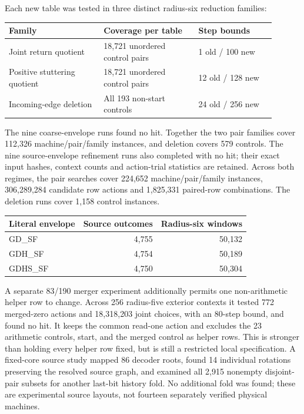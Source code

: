 Each new table was tested in three distinct radius-six reduction families:
\begin{center}\small
\begin{tabular}{@{}p{0.32\linewidth}p{0.32\linewidth}p{0.26\linewidth}@{}}
\toprule Family & Coverage per table & Step bounds\\\midrule
Joint return quotient & 18,721 unordered control pairs & 1 old / 100 new\\[3pt]
Positive stuttering quotient & 18,721 unordered control pairs & 12 old / 128 new\\[3pt]
Incoming-edge deletion & All 193 non-start controls & 24 old / 256 new\\
\bottomrule
\end{tabular}
\end{center}
The nine coarse-envelope runs found no hit. Together the two pair families
cover 112,326 machine/pair/family instances, and deletion covers 579 controls.
The nine source-envelope refinement runs also completed with no hit;
their exact input hashes, context counts and action-trial statistics are retained.
Across both regimes, the pair searches cover 224,652 machine/pair/family instances, 306,289,284 candidate row actions and 1,825,331 paired-row combinations. The deletion runs cover 1,158 control instances.
\begin{center}\small
\begin{tabular}{@{}lrr@{}}
\toprule
Literal envelope & Source outcomes & Radius-six windows\\\midrule
GD\_SF & 4,755 & 50,132\\
GDH\_SF & 4,754 & 50,189\\
GDHS\_SF & 4,750 & 50,304\\
\bottomrule
\end{tabular}
\end{center}
A separate 83/190 merger experiment additionally permits one non-arithmetic
helper row to change. Across 256 radius-five exterior contexts it tested
772 merged-zero actions and 18,318,203 joint choices, with an 80-step bound,
and found no hit. It keeps the common read-one action and excludes the
23 arithmetic controls, start, and the merged control as helper rows.
This is stronger than holding every helper row fixed, but is still a
restricted local specification.
A fixed-core source study mapped 86 decoder roots, found 14 individual
rotations preserving the resolved source graph, and examined all 2,915
nonempty disjoint-pair subsets for another last-bit history fold.
No additional fold was found; these are experimental source layouts,
not fourteen separately verified physical machines.
